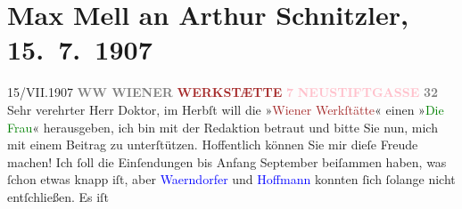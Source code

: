 

               \section[Max Mell an Arthur Schnitzler, 15. 7. 1907]{ Max Mell an Arthur Schnitzler, 15. 7. 1907}\nopagebreak{}\rehead{ }\normalsize\beginnumbering{} \toendnotes[C]{\smallbreak\pagebreak[2]} 
\toendnotes[C]{\smallbreak}\pstart
           \noindent{}{\pb}15/VII.\hfill 1907\pend
           \pstart
           \centering{}\textcolor{gray}{\textbf{WW WIENER}}\pend
           \pstart
           \noindent{}\centering{}\textcolor{gray}{\textbf{\textcolor{brown}{WERKSTÆTTE}{}\ledrightnote{\textcolor{brown}{Wiener Werkstätte}}}}\pend
           \pstart
           \noindent{}\centering{}\textcolor{gray}{\textbf{\textcolor{pink}{7}{}\ledrightnote{\textcolor{pink}{VII., Neubau}}}}\pend
           \pstart
           \noindent{}\centering{}\textcolor{gray}{\textbf{\textcolor{pink}{NEUSTIFTGASSE}{}\ledrightnote{\textcolor{pink}{Neustiftgasse}}}}\pend
           \pstart
           \noindent{}\centering{}\textcolor{gray}{\textbf{32}}\pend
           \pstart{}Sehr verehrter Herr Doktor,\pend\pstart
           im Herbſt will die »\textcolor{brown}{Wiener Werkſtätte}{}\ledrightnote{\textcolor{brown}{Wiener Werkstätte}}« einen
                        \label{K_L01692_1v}\label{K_L01692_1h} »\textcolor{green}{Die Frau}{}« herausgeben, ich
                    bin mit der Redaktion betraut und bitte Sie nun, mich mit einem Beitrag zu
                    unterſtützen. Hoffentlich können Sie mir dieſe Freude machen! Ich ſoll die
                    Einſendungen bis Anfang September beiſammen haben, was ſchon etwas knapp iſt,
                    aber \textcolor{blue}{Waerndorfer}{}\ledrightnote{\textcolor{blue}{Friedrich Wärndorfer}} und \textcolor{blue}{Hoffmann}{}\ledrightnote{\textcolor{blue}{Josef Hoffmann}} konnten ſich ſolange nicht entſchließen. Es iſt

